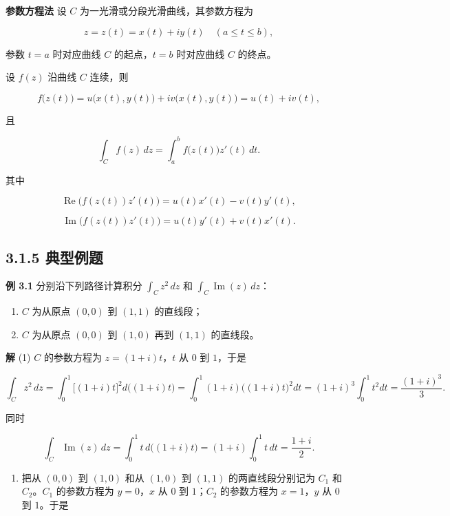 \textbf{参数方程法} 设 \(C\) 为一光滑或分段光滑曲线，其参数方程为

\[
z=z(t)=x(t)+iy(t)\quad(a\le t\le b),
\]

参数 \(t=a\) 时对应曲线 \(C\) 的起点，\(t=b\) 时对应曲线 \(C\) 的终点。

设 \(f(z)\) 沿曲线 \(C\) 连续，则

\[
f\bigl(z(t)\bigr)=u\bigl(x(t),y(t)\bigr)+iv\bigl(x(t),y(t)\bigr)=u(t)+iv(t),
\]

且

\[
\int_C f(z)\,dz=\int_a^b f\bigl(z(t)\bigr)z'(t)\,dt .
\]

其中

\[
\operatorname{Re}\bigl(f(z(t))z'(t)\bigr)=u(t)x'(t)-v(t)y'(t),
\]

\[
\operatorname{Im}\bigl(f(z(t))z'(t)\bigr)=u(t)y'(t)+v(t)x'(t).
\]

\subsection{3.1.5 典型例题}\label{ux5178ux578bux4f8bux9898}

\textbf{例 3.1} 分别沿下列路径计算积分 \(\int_C z^2\,dz\) 和
\(\int_C\operatorname{Im}(z)\,dz\)：

\begin{enumerate}
\def\labelenumi{\arabic{enumi}.}
\tightlist
\item
  \(C\) 为从原点 \((0,0)\) 到 \((1,1)\) 的直线段；
\item
  \(C\) 为从原点 \((0,0)\) 到 \((1,0)\) 再到 \((1,1)\) 的直线段。
\end{enumerate}

\textbf{解} (1) \(C\) 的参数方程为 \(z=(1+i)t\)，\(t\) 从 \(0\) 到
\(1\)，于是

\[
\int_C z^2\,dz
=\int_0^1\bigl[(1+i)t\bigr]^2 d\bigl((1+i)t\bigr)
=\int_0^1 (1+i)\bigl((1+i)t\bigr)^2dt
=(1+i)^3\int_0^1 t^2dt
=\frac{(1+i)^3}{3}.
\]

同时

\[
\int_C\operatorname{Im}(z)\,dz=\int_0^1 t\,d\bigl((1+i)t\bigr)=(1+i)\int_0^1 t\,dt=\frac{1+i}{2}.
\]

\begin{enumerate}
\def\labelenumi{(\arabic{enumi})}
\setcounter{enumi}{1}
\tightlist
\item
  把从 \((0,0)\) 到 \((1,0)\) 和从 \((1,0)\) 到 \((1,1)\)
  的两直线段分别记为 \(C_1\) 和 \(C_2\)。\(C_1\) 的参数方程为
  \(y=0\)，\(x\) 从 \(0\) 到 \(1\)；\(C_2\) 的参数方程为 \(x=1\)，\(y\)
  从 \(0\) 到 \(1\)。于是
\end{enumerate}


